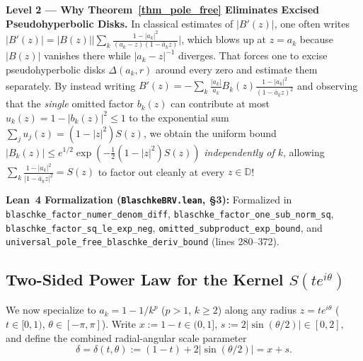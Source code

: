 \documentclass[11pt,reqno]{amsart}
\numberwithin{equation}{section}
\newcommand{\D}{\mathbb{D}}
\begin{document}
\begin{leveltwo}
\noindent\textbf{\textcolor{l2border}{Level 2 --- Why Theorem~\ref{thm_pole_free} Eliminates Excised Pseudohyperbolic Disks.}}
In classical estimates of $|B'(z)|$, one often writes $|B'(z)| = |B(z)| \bigl|\sum_k \frac{1 - |a_k|^2}{(a_k - z)(1 - \bar{a}_k z)}\bigr|$, which blows up at $z = a_k$ because $|B(z)|$ vanishes there while $|a_k - z|^{-1}$ diverges. That forces one to excise pseudohyperbolic disks $\Delta(a_k, r)$ around every zero and estimate them separately. By instead writing $B'(z) = -\sum_k \frac{|a_k|}{a_k} B_k(z) \frac{1 - |a_k|^2}{(1 - \bar{a}_k z)^2}$ and observing that the \emph{single} omitted factor $b_k(z)$ can contribute at most $u_k(z) = 1 - |b_k(z)|^2 \le 1$ to the exponential sum $\sum_j u_j(z) = (1 - |z|^2) S(z)$, we obtain the uniform bound $|B_k(z)| \le e^{1/2} \exp(-\frac{1}{2}(1-|z|^2)S(z))$ \emph{independently of $k$}, allowing $\sum_k \frac{1-|a_k|^2}{|1-\bar{a}_k z|^2} = S(z)$ to factor out cleanly at every $z \in \D$!

\smallskip
\noindent\textbf{\textcolor{leannote}{Lean~4 Formalization (\texttt{BlaschkeBRV.lean}, \S 3):}} Formalized in \texttt{blaschke\_factor\_numer\_denom\_diff}, \texttt{blaschke\_factor\_one\_sub\_norm\_sq}, \texttt{blaschke\_factor\_sq\_le\_exp\_neg}, \texttt{omitted\_subproduct\_exp\_bound}, and \texttt{universal\_pole\_free\_blaschke\_deriv\_bound} (lines 280--372).
\end{leveltwo}

\subsection{Two-Sided Power Law for the Kernel $S(t e^{i\theta})$}

We now specialize to $a_k = 1 - 1/k^p$ ($p > 1$, $k \ge 2$) along any radius $z = t e^{i\theta}$ ($t \in [0, 1)$, $\theta \in [-\pi, \pi]$). Write $x := 1 - t \in (0, 1]$, $s := 2|\sin(\theta/2)| \in [0, 2]$, and define the combined radial-angular scale parameter
\begin{equation} \label{eq_delta_scale}
  \delta = \delta(t, \theta) := (1 - t) + 2|\sin(\theta/2)| = x + s.
\end{equation}
\end{document}
